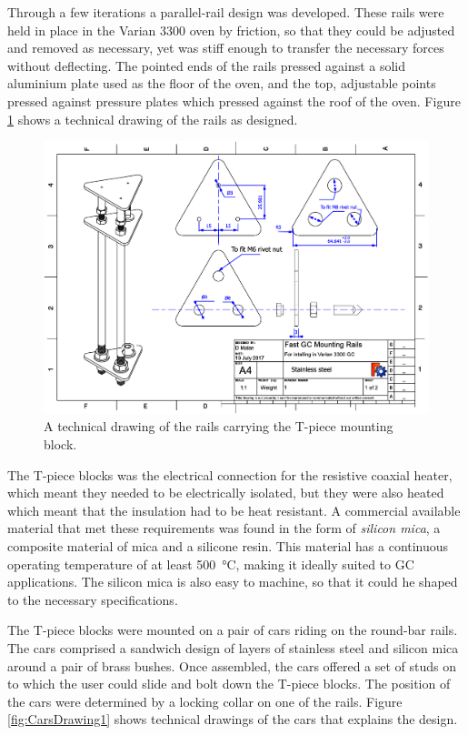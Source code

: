 Through a few iterations a parallel-rail design was developed. These rails were
held in place in the Varian 3300 oven by friction, so that they could be
adjusted and removed as necessary, yet was stiff enough to transfer the
necessary forces without deflecting. The pointed ends of
the rails pressed against a solid aluminium plate used as the floor of the oven,
and the top, adjustable points pressed against pressure plates which pressed
against the roof of the oven. Figure \ref{fig:RailsDrawing} shows a
technical drawing of the rails as designed. 

\begin{figure}
	\centering
	\includegraphics[angle=90, origin=c, scale=0.75]{Figures/RailsDrawing.pdf}
	\decoRule	
\caption[Technical drawing of coaxial heater mounting rails]{\label{fig:RailsDrawing}A technical drawing of the rails carrying the T-piece mounting block.} 
	
\end{figure}

The T-piece blocks was the electrical connection for the resistive coaxial heater,
which meant they needed to be electrically isolated, but they were also heated
which meant that the insulation had to be heat resistant. A commercial available
material that met these requirements was found in the form of \textit{silicon
mica}, a composite material of mica and a silicone resin. This material has a
continuous operating temperature of at least \SI{500}{\celsius}, making it
ideally suited to GC applications. The silicon mica is also easy to machine, so
that it could he shaped to the necessary specifications.

The T-piece blocks were mounted on a pair of cars riding on the round-bar rails.
The cars comprised a sandwich design of layers of stainless steel and silicon
mica around a pair of brass bushes. Once assembled, the cars offered a set of
studs on to which the user could slide and bolt down the T-piece blocks. The
position of the cars were determined by a locking collar on one of the rails.
Figure \ref{fig:CarsDrawing1} shows technical drawings of the cars that explains
the design.

